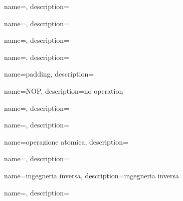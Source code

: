 {
  name={\ITph},
  description={\ITph{}}
}

{
  name={\ITph},
  description={\ITph{}}
}

{
  name={\ITph},
  description={\ITph{}}
}

{
  name={\ITph},
  description={\ITph{}}
}

{
  name={padding},
  description={\ITph{}}
}

{
  name={NOP},
  description={no operation}
}

{
  name={\ITph},
  description={\ITph{}}
}

{
  name={\ITph},
  description={\ITph{}}
}

{
  name={operazione atomica},
  description={\ITph{}}
}

{
  name={\ITph},
  description={\ITph{}}
}

{
  name={ingegneria inversa},
  description={ingegneria inversa}
}

{
  name={\ITph},
  description={\ITph{}}
}


